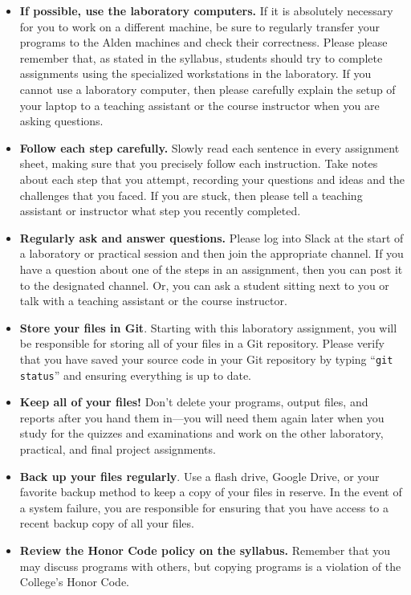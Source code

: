 \vspace*{-.1in}
\begin{itemize}
  \setlength{\itemsep}{-.01in}

  \item {\bf If possible, use the laboratory computers.} If it is absolutely necessary for you to work on a different
    machine, be sure to regularly transfer your programs to the Alden machines and check their correctness. Please
    please remember that, as stated in the syllabus, students should try to complete assignments using the specialized
    workstations in the laboratory. If you cannot use a laboratory computer, then please carefully explain the setup of
    your laptop to a teaching assistant or the course instructor when you are asking questions.

  \item {\bf Follow each step carefully.} Slowly read each sentence in every assignment sheet, making sure that you
    precisely follow each instruction. Take notes about each step that you attempt, recording your questions and ideas
    and the challenges that you faced. If you are stuck, then please tell a teaching assistant or instructor what step
    you recently completed.

  \item {\bf Regularly ask and answer questions.} Please log into Slack at the start of a laboratory or practical
    session and then join the appropriate channel. If you have a question about one of the steps in an assignment, then
    you can post it to the designated channel. Or, you can ask a student sitting next to you or talk with a teaching
    assistant or the course instructor.

  \item {\bf Store your files in Git}. Starting with this laboratory assignment, you will be responsible for storing all
    of your files in a Git repository. Please verify that you have saved your source code in your Git repository by
    typing ``{\tt git status}'' and ensuring everything is up to date.

  \item {\bf Keep all of your files!} Don't delete your programs, output files, and reports after you hand them in---you
    will need them again later when you study for the quizzes and examinations and work on the other laboratory,
    practical, and final project assignments.

  \item {\bf Back up your files regularly}. Use a flash drive, Google Drive, or your favorite backup method to keep a
    copy of your files in reserve. In the event of a system failure, you are responsible for ensuring that you have
    access to a recent backup copy of all your files.

  \item {\bf Review the Honor Code policy on the syllabus.} Remember that you may discuss programs with others, but
    copying programs is a violation of the College's Honor Code.

\end{itemize}

